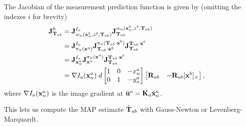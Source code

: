 The Jacobian of the measurement prediction function is given by (omitting the indexes $i$ for brevity)
\begin{subequations} \label{eq:direct-pose-jacobian}
\begin{align}
  \jac{h}{\matT_{ab}} &= \jac{I_a}{w_n(\vecx^b_n, z^b, \matT_{ab})} \jac{w_n(\vecx^b_n, z^b, \matT_{ab})}{\matT_{ab}}\\
  &= \jac{I_a}{\pi_n(\vecx^a)} \jac{\pi_n(\matT_{ab} \cdot \vecx^b)}{\matT_{ab} \cdot \vecx^b} \jac{\matT_{ab} \cdot \vecx^b}{\matT_{ab}}\\
  &= \jac{I_a}{\vecx^a_n} \jac{\pi_n(\vecx^a)}{\vecx^a} \jac{\matT_{ab} \cdot \vecx^b}{\matT_{ab}}\\
  &= \nabla I_a(\vecx^a_n) \;
   d
  \begin{bmatrix}
  1 & 0 & -x^a_n\\
  0 & 1 & -y^a_n
  \end{bmatrix}
  \begin{bmatrix}
    \matR_{ab} & -\matR_{ab} \skewsymm{\vecx^b}
  \end{bmatrix},
\end{align}
\end{subequations}
where $\nabla I_a(\vecx^a_n)$ is the image gradient at $\breve{\vecu}^a = \matK_a \breve{\vecx}^a_n$.

This lets us compute the MAP estimate $\hat{\matT}_{ab}$ with Gauss-Newton or Levenberg-Marquardt.



